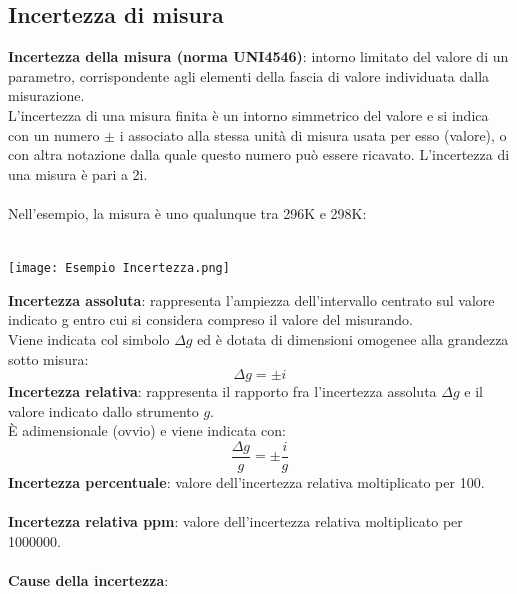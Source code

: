 \documentclass{article}
\begin{document}
\subsection{Incertezza di misura}
\textbf{Incertezza della misura (norma UNI4546)}: intorno limitato del valore di un parametro, 
corrispondente agli elementi della fascia di valore individuata dalla misurazione. \\
L'incertezza di una misura finita è un intorno simmetrico del valore e si indica con un 
numero $\pm$ i associato alla stessa unità di misura usata per esso (valore), o con altra notazione 
dalla quale questo numero può essere ricavato. L’incertezza di una misura è pari a 2i.\\\\
Nell'esempio, la misura è uno qualunque tra 296K e 298K:\\\\
\begin{center}
    \texttt{[image: Esempio Incertezza.png]}
\end{center}
\textbf{Incertezza assoluta}: rappresenta l'ampiezza dell'intervallo centrato sul valore indicato g entro cui 
si considera compreso il valore del misurando.\\ Viene indicata col simbolo $\Delta g$ ed è dotata di 
dimensioni omogenee alla grandezza sotto misura: 
\begin{equation}
    \Delta g=\pm i
\end{equation}
\textbf{Incertezza relativa}: rappresenta il rapporto fra l'incertezza assoluta $\Delta g$ e il valore indicato dallo strumento $g$.\\ È adimensionale (ovvio) e viene indicata con:
\begin{equation}
    \frac{\Delta g}{g}=\pm \frac{i}{g}
\end{equation}
\textbf{Incertezza percentuale}: valore dell'incertezza relativa moltiplicato per 100. \\ \\
\textbf{Incertezza relativa ppm}: valore dell'incertezza relativa moltiplicato per 1000000. \\ \\
\textbf{Cause della incertezza}:
\end{document}
